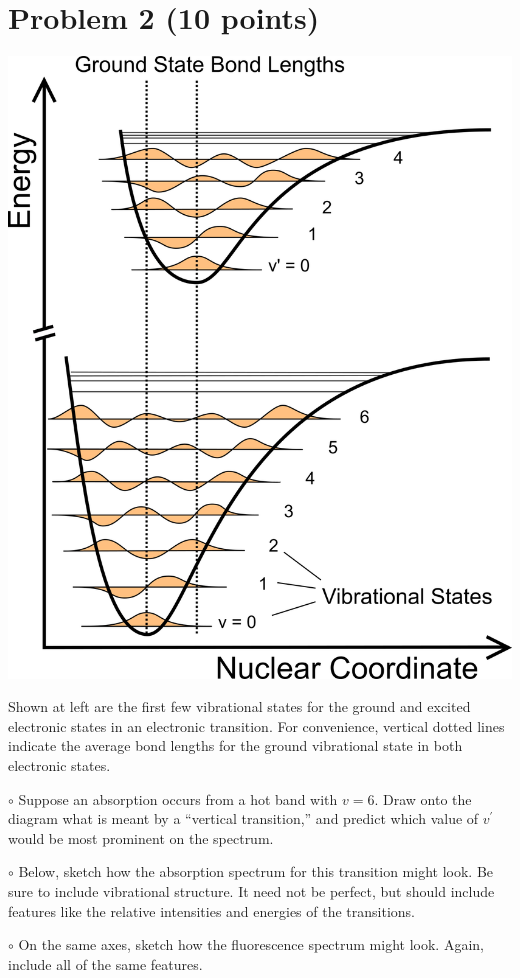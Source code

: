 \documentclass[10pt, letterpaper]{memoir}
\begin{document}
	\section*{Problem 2 (10 points)}
	\begin{minipage}{0.5\linewidth}
		\includegraphics[width=\linewidth]{FC_Factors}
	\end{minipage}
	\begin{minipage}{0.5\linewidth}
		Shown at left are the first few vibrational states for the ground and excited electronic states in an electronic transition. For convenience, vertical dotted lines indicate the average bond lengths for the ground vibrational state in both electronic states.
		
		\noindent $\circ$ Suppose an absorption occurs from a hot band with $v=6$. Draw onto the diagram what is meant by a ``vertical transition,'' and predict which value of $v^\prime$ would be most prominent on the spectrum.
		
		\vspace{3em}
		\noindent$\circ$ Below, sketch how the absorption spectrum for this transition might look. Be sure to include vibrational structure. It need not be perfect, but should include features like the relative intensities and energies of the transitions.
		
		\noindent $\circ$ On the same axes, sketch how the fluorescence spectrum might look. Again, include all of the same features.
	\end{minipage}	
\end{document}
